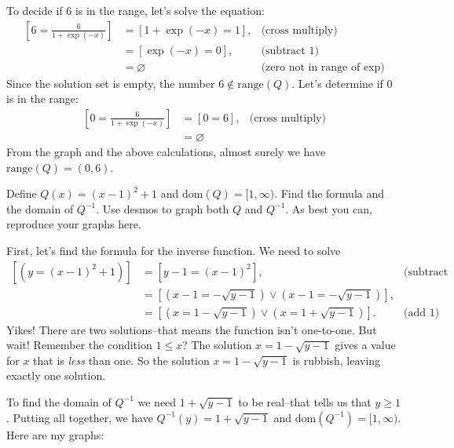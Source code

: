 \documentclass[12pt,fleqn,answers]{exam}
\newcommand{\dom}{\mbox{dom}}
\newcommand{\range}{\mbox{range}}
\begin{document}
\begin{questions}
\begin{solution}[3.5in]
\quad To decide if $6$ is in the range, let's solve the equation:
\begin{align*}
    \left[ 6 = \frac{6}{1+\exp(-x)} \right] &= \left[1+\exp(-x) = 1 \right], 
                                            &\mbox{(cross multiply)}\\
                                            &= \left[\exp(-x) = 0 \right], 
                                            &\mbox{(subtract 1)}\\
                                            &= \varnothing  &\mbox{(zero not in range of $\exp$)}
\end{align*}
Since the solution set is empty, the number $6 \notin \range(Q)$.  Let's determine
if $0$ is in the range:
\begin{align*}
    \left[ 0 = \frac{6}{1+\exp(-x)} \right] &= \left[ 0 = 6 \right], 
                                            &\mbox{(cross multiply)}\\
                                            &= \varnothing  
\end{align*}
From the graph and the above calculations, almost surely we have $\range(Q) = (0,6)$. 

\end{solution}

\newpage

\question[5] Define $Q(x) = (x-1)^2 + 1$ and $\dom(Q) = [1,\infty)$. Find the formula
and the domain of $Q^{-1}$. Use desmos to graph both $Q$ and $Q^{-1}$. As best you can,
reproduce your graphs here.
\begin{solution} First, let's find the formula for the  inverse function. We need to solve
\begin{align*}
 \left[ \left(y = (x-1)^2 + 1 \right) \right] &=  \left[ y -  1 = (x-1)^2\right],   & \mbox{(subtract 1)} \\
         &= \left[ \left(x-1 = -\sqrt{y -  1} \right) \lor  \left(x-1 = -\sqrt{y -  1} \right) \right],  \\
         &= \left[ \left(x = 1 -\sqrt{y -  1} \right) \lor  \left(x = 1 +\sqrt{y -  1} \right)\right]. & \mbox{(add 1)}
\end{align*}
Yikes! There are two solutions--that means the function isn't one-to-one. But wait! Remember the condition
\(1 \leq x\)?  The solution \(x = 1 -\sqrt{y -  1}\) gives a value for $x$ that is \emph{less} than one. So the
solution \(x = 1 -\sqrt{y -  1}\) is rubbish, leaving exactly one solution. 

\quad To find the domain of $Q^{-1}$ we need $1 + \sqrt{y -  1}$ to be real--that tells us that \mbox{$y \geq 1$}.  
Putting all together, we have $Q^{-1}(y) =  1 +  \sqrt{y -  1}$ and $\dom(Q^{-1}) = [1,\infty)$.
Here are my graphs:


\end{solution}
\end{questions}
\end{document}
